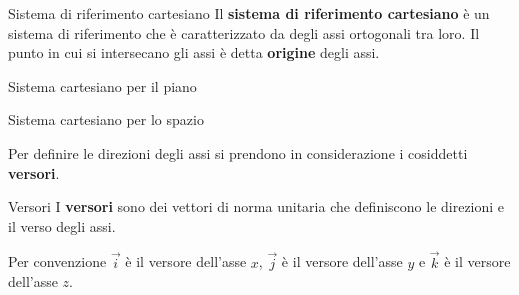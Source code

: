 \begin{newdef}{Sistema di riferimento cartesiano}
    Il \textbf{sistema di riferimento cartesiano} è un sistema di riferimento che è caratterizzato da degli assi ortogonali tra loro. Il punto in cui si intersecano gli assi è detta \textbf{origine} degli assi.
\end{newdef}
\begin{center}
    \begin{minipage}{0.4\linewidth}
        \tikzset{external/export = true}
        \tikzset{external/export = false}
        \centering
        Sistema cartesiano per il piano
    \end{minipage}
    \begin{minipage}{0.4\linewidth}
        \tikzset{external/export = true}
        \tikzset{external/export = false}
        \centering
        Sistema cartesiano per lo spazio
    \end{minipage}
\end{center}
Per definire le direzioni degli assi si prendono in considerazione i cosiddetti \textbf{versori}.
\begin{newdef}{Versori}
    I \textbf{versori} sono dei vettori di norma unitaria che definiscono le direzioni e il verso degli assi.

    Per convenzione $\vec i$ è il versore dell'asse $x$, $\vec j$ è il versore dell'asse $y$ e $\vec k$ è il versore dell'asse $z$.
\end{newdef}
